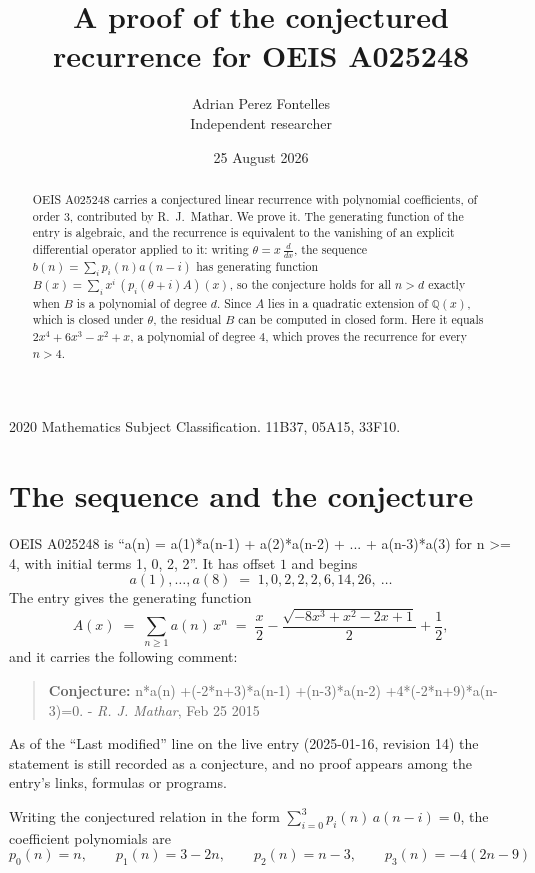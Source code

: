 \documentclass[11pt,a4paper]{article}
\title{A proof of the conjectured recurrence for OEIS A025248}
\author{Adrian Perez Fontelles\\ \small Independent researcher}
\date{25 August 2026}
\theoremstyle{plain}
\theoremstyle{definition}
\begin{document}
\maketitle

\begin{abstract}
OEIS A025248 carries a conjectured linear recurrence with polynomial coefficients, of
order 3, contributed by R.~J.~Mathar. We prove it. The generating function of the
entry is algebraic, and the recurrence is equivalent to the vanishing of an explicit
differential operator applied to it: writing $\theta=x\,\frac{d}{dx}$, the sequence
$b(n)=\sum_{i}p_{i}(n)a(n-i)$ has generating function
$B(x)=\sum_{i}x^{i}\,(p_{i}(\theta+i)A)(x)$, so the conjecture holds for all $n>d$ exactly
when $B$ is a polynomial of degree $d$. Since $A$ lies in a quadratic extension of
$\mathbb{Q}(x)$, which is closed under $\theta$, the residual $B$ can be computed in
closed form. Here it equals $2 x^{4} + 6 x^{3} - x^{2} + x$, a polynomial of degree $4$, which proves
the recurrence for every $n>4$.
\end{abstract}

\noindent\small 2020 Mathematics Subject Classification. 11B37, 05A15, 33F10.\normalsize

\section{The sequence and the conjecture}

OEIS A025248 is ``a(n) = a(1)*a(n-1) + a(2)*a(n-2) + ... + a(n-3)*a(3) for n >= 4, with initial terms 1, 0, 2, 2''. It has offset $1$ and begins
\[
a(1),\dots,a(8)\;=\;1, 0, 2, 2, 2, 6, 14, 26,\ \dots
\]
The entry gives the generating function
\begin{equation}\label{eq:gf}
A(x)\;=\;\sum_{n\ge 1} a(n)\,x^{n}\;=\;\frac{x}{2} - \frac{\sqrt{- 8 x^{3} + x^{2} - 2 x + 1}}{2} + \frac{1}{2} ,
\end{equation}
and it carries the following comment:
\begin{quote}\small
\textbf{Conjecture:} n*a(n) +(-2*n+3)*a(n-1) +(n-3)*a(n-2) +4*(-2*n+9)*a(n-3)=0. - \emph{R. J. Mathar}, Feb 25 2015
\end{quote}
As of the ``Last modified'' line on the live entry (2025-01-16, revision 14) the
statement is still recorded as a conjecture, and no proof appears among the entry's links,
formulas or programs.

Writing the conjectured relation in the form $\sum_{i=0}^{3}p_{i}(n)\,a(n-i)=0$,
the coefficient polynomials are
\[
p_{0}(n)=n,\qquad p_{1}(n)=3 - 2 n,\qquad p_{2}(n)=n - 3,\qquad p_{3}(n)=- 4 \left(2 n - 9\right)
\]
\end{document}
